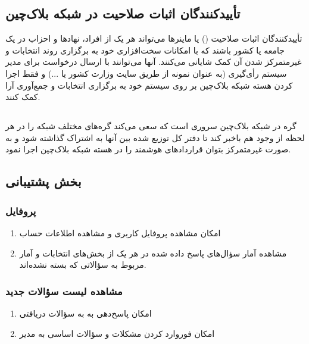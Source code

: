 \documentclass[12pt]{article}
\begin{document}
\subsection{تأییدکنند‌گان اثبات صلاحیت در شبکه بلاک‌چین}
تأییدکنند‌گان اثبات صلاحیت 
()
یا ماینرها می‌تواند هر یک از افراد، نهادها و احزاب در یک جامعه یا کشور باشند که با امکانات سخت‌افزاری خود به برگزاری روند انتخابات و غیرمتمرکز شدن آن کمک شایانی می‌کنند. آنها می‌توانند با ارسال درخواست برای مدیر سیستم رأی‌گیری (به عنوان نمونه از طریق سایت وزارت کشور یا ...) و فقط اجرا کردن هسته شبکه بلاک‌چین بر روی سیستم خود به برگزاری انتخابات و جمع‌آوری آرا کمک کنند.  




\subsection{}
گره  در شبکه بلاک‌چین سروری است که سعی می‌کند گره‌های مختلف شبکه را در هر لحظه از وجود هم باخبر کند تا دفتر کل توزیع شده بین آنها به اشتراک گذاشته شود و به صورت غیرمتمرکز بتوان قراردادهای هوشمند را در هسته شبکه بلاک‌چین اجرا نمود. 




\subsection{بخش پشتیبانی}

\subsubsection{پروفایل}

\begin{enumerate}[label=(\arabic*)]
\item
امکان مشاهده پروفایل کاربری و مشاهده اطلاعات حساب 
\item
مشاهده آمار سؤال‌های پاسخ داده شده در هر یک از بخش‌های انتخابات و آمار مربوط به سؤالاتی که بسته نشده‌اند.
\end{enumerate}


\subsubsection{مشاهده لیست سؤالات جدید}

\begin{enumerate}[label=(\arabic*)]
\item
امکان پاسخ‌دهی به به سؤالات دریافتی
\item
امکان فوروارد کردن مشکلات و سؤالات اساسی به مدیر
\end{enumerate}
\end{document}
